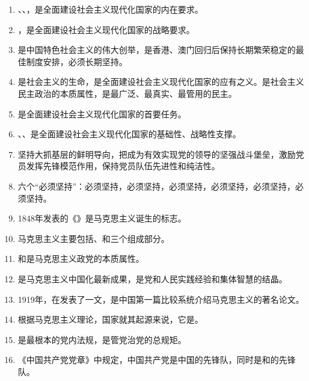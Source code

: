 \documentclass[UTF8,11pt,a4paper]{ctexart}
\begin{document}
\begin{enumerate}[label=\textbf{\arabic*.}, leftmargin=2.5em, itemsep=0.5em]
\item {}、、，是全面建设社会主义现代化国家的内在要求。
\item {}，是全面建设社会主义现代化国家的战略要求。
\item {}是中国特色社会主义的伟大创举，是香港、澳门回归后保持长期繁荣稳定的最佳制度安排，必须长期坚持。
\item {}是社会主义的生命，是全面建设社会主义现代化国家的应有之义。是社会主义民主政治的本质属性，是最广泛、最真实、最管用的民主。
\item {}是全面建设社会主义现代化国家的首要任务。
\item {}、、是全面建设社会主义现代化国家的基础性、战略性支撑。
\item 坚持大抓基层的鲜明导向，把成为有效实现党的领导的坚强战斗堡垒，激励党员发挥先锋模范作用，保持党员队伍先进性和纯洁性。
\item 六个“必须坚持”：必须坚持，必须坚持，必须坚持，必须坚持，必须坚持，必须坚持。
\item 1848年发表的《》是马克思主义诞生的标志。
\item 马克思主义主要包括、和三个组成部分。
\item {}和是马克思主义政党的本质属性。
\item {}是马克思主义中国化最新成果，是党和人民实践经验和集体智慧的结晶。
\item 1919年，在发表了一文，是中国第一篇比较系统介绍马克思主义的著名论文。
\item 根据马克思主义理论，国家就其起源来说，它是。
\item {}是最根本的党内法规，是管党治党的总规矩。
\item 《中国共产党党章》中规定，中国共产党是中国的先锋队，同时是和的先锋队。

\end{enumerate}
\end{document}
